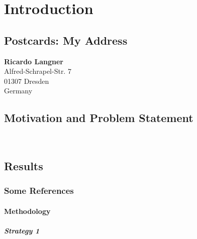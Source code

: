 %
\chapter{Introduction}
\label{sec:intro}


\Blindtext[2][2]

\section{Postcards: My Address}
\label{sec:intro:address}

\textbf{Ricardo Langner} \\
Alfred-Schrapel-Str. 7 \\
01307 Dresden \\
Germany


\section{Motivation and Problem Statement}
\label{sec:intro:motivation}

\Blindtext[3][1]~\cite{Jurgens:2000,Jurgens:1995,Miede:2011,Kohm:2011,Apple:keynote:2010,Apple:numbers:2010,Apple:pages:2010}

\section{Results}
\label{sec:intro:results}

\Blindtext[1][2]

\subsection{Some References}
\label{sec:intro:results:refs}

\cite{WEB:GNU:GPL:2010,WEB:Miede:2011}
\Blindtext[1][1]

\subsubsection{Methodology}
\label{sec:intro:results:refs:method}

\Blindtext[1][2]

\paragraph{Strategy 1}
\Blindtext[1][1]

